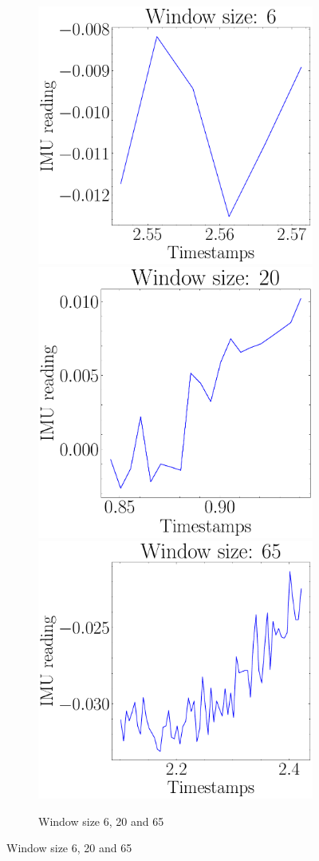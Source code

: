 \begin{figure}[H]
    \begin{subfigure}{\linewidth}
    \includegraphics[width=.3\linewidth]{images/fig_chapter4/imu_windows/imu_window_size_6.pdf}\hfill
    \includegraphics[width=.3\linewidth]{images/fig_chapter4/imu_windows/imu_window_size_20.pdf}\hfill
    \includegraphics[width=.3\linewidth]{images/fig_chapter4/imu_windows/imu_window_size_65.pdf}\hfill
    \caption{Window size 6, 20 and 65}
    \end{subfigure}\par\medskip
    

\end{figure}
